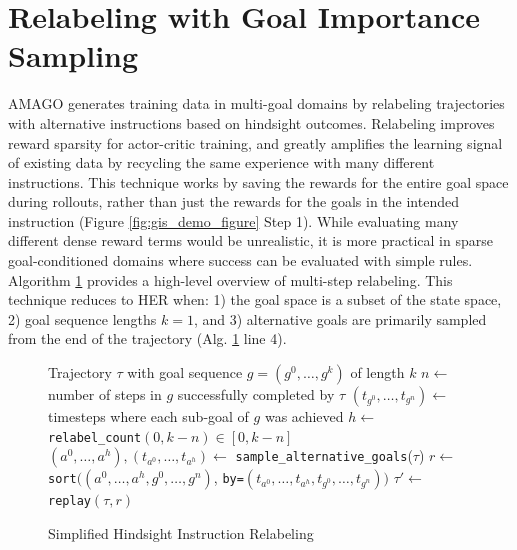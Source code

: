 \documentclass{article}
\begin{document}
\section{Relabeling with Goal Importance Sampling}
\label{app:importance_sampling}
AMAGO generates training data in multi-goal domains by relabeling trajectories with alternative instructions based on hindsight outcomes. Relabeling improves reward sparsity for actor-critic training, and greatly amplifies the learning signal of existing data by recycling the same experience with many different instructions. This technique works by saving the rewards for the entire goal space during rollouts, rather than just the rewards for the goals in the intended instruction (Figure \ref{fig:gis_demo_figure} Step 1). While evaluating many different dense reward terms would be unrealistic, it is more practical in sparse goal-conditioned domains where success can be evaluated with simple rules. Algorithm \ref{alg:relabel} provides a high-level overview of multi-step relabeling. This technique reduces to HER \cite{andrychowicz2017hindsight} when: 1) the goal space is a subset of the state space, 2) goal sequence lengths $k = 1$, and 3) alternative goals are primarily sampled from the end of the trajectory (Alg. \ref{alg:relabel} line 4).
\begin{figure}[h!]
\centering
\begin{minipage}{.99\linewidth}
\begin{algorithm}[H]
\caption{Simplified Hindsight Instruction Relabeling \label{algo}}
\begin{algorithmic}[1]
    \Require Trajectory $\tau$ with goal sequence $g = (g^0, \dots, g^k)$ of length $k$
    \vspace{2mm}
    \State $n \leftarrow$ number of steps in $g$ successfully completed by $\tau$
    \State $(t_{g^0}, \dots, t_{g^n}) \leftarrow$ timesteps where each sub-goal of $g$ was achieved
    \State $h \leftarrow $ \texttt{relabel\_count}$(0, k - n) \in [0, k-n]$ \Comment{\textcolor{cyan}{Choose a number of hindsight goals to insert. Defaults to uniform sampling.}}
    \State $(a^0, \dots, a^h), (t_{a^0}, \dots, t_{a^h}) \leftarrow$ \texttt{sample\_alternative\_goals}($\tau$) \Comment{\textcolor{cyan}{Sample a goal from $h$ timesteps in $\tau$ that completed alternative objectives. Defualts to uniform sampling.}}
    \State $r \leftarrow$ \texttt{sort}$\big((a^0, \dots, a^h, g^0, \dots, g^n)$, \texttt{by=}$(t_{a^0}, \dots, t_{a^h}, t_{g^0}, \dots, t_{g^n})\big)$ \Comment{\textcolor{cyan}{Insert new goals in chronological order.}}
    \State $\tau' \leftarrow$ \texttt{replay}$(\tau, r)$ 
\end{algorithmic}
\label{alg:relabel}
\end{algorithm}
\end{minipage}
\end{figure}
\end{document}
